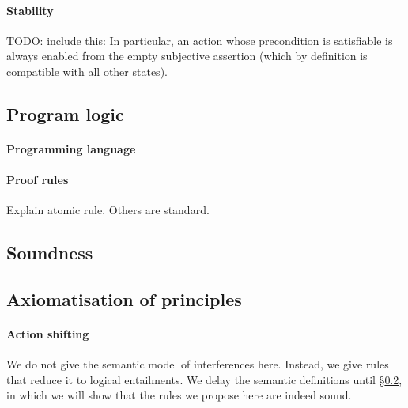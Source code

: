 %	

\paragraph{Stability}
TODO: include this: In particular,
an action whose precondition is satisfiable is always enabled from the
empty subjective assertion (which by definition is compatible with all
other states). 


\subsection{Program logic}

\paragraph{Programming language}

\paragraph{Proof rules}
Explain atomic rule. Others are standard.



\subsection{Soundness}
\label{sec:soundness}


\subsection{Axiomatisation of \colosl principles}

\paragraph{Action shifting}
We do not give the semantic model of interferences here. Instead, we
give rules that reduce it to logical entailments. We delay the
semantic definitions until \S\ref{sec:soundness}, in which we will
show that the rules we propose here are indeed sound.

